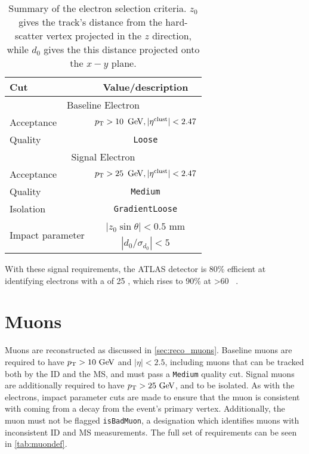 \begin{table}[ph!]
\begin{center}
    \begin{tabular}{l|c}
      \hline
      Cut            & Value/description \\
      \hline
      \hline
      \multicolumn{2}{c}{Baseline Electron}\\
      \hline
      Acceptance   & $\pt > 10\,\GeV, |\eta^\mathrm{clust}| < 2.47$ \\
      Quality      & \texttt{Loose} \\
      \hline
      \multicolumn{2}{c}{Signal Electron}\\
      \hline
      Acceptance   & $\pt > 25\,\GeV, |\eta^\mathrm{clust}| < 2.47$ \\
      Quality          & \texttt{Medium} \\
      Isolation        & \texttt{GradientLoose} \\
      \multirow{2}{*}{Impact parameter} & $|z_0 \sin\theta|< 0.5$ mm \\
                       & $|d_0/\sigma_{d_0}|< 5$ \\ 
      \hline
      \hline
\end{tabular}
\end{center}
\caption{Summary of the electron selection criteria. $z_0$ gives the track's distance from the hard-scatter vertex projected in the $z$ direction, while $d_0$ gives the this distance projected onto the $x-y$ plane.}              
\label{tab:eledef}
\end{table}

With these signal requirements, the \ac{ATLAS} detector is 80\% efficient at identifying electrons with a \pt of 25 \gev, which rises to 90\% at \pt>60 \gev~\cite{ATLAS-CONF-2014-032}. %

\section{Muons}

Muons are reconstructed as discussed in \autoref{sec:reco_muons}. Baseline muons are required to have $\pt>10\gev$ and $|\eta|<2.5$, including muons that can be tracked both by the \ac{ID} and the \ac{MS}, and must pass a \texttt{Medium} quality cut. Signal muons are additionally required to have $\pt>25\gev$, and to be isolated. As with the electrons, impact parameter cuts are made to ensure that the muon is consistent with coming from a decay from the event's primary vertex. Additionally, the muon must not be flagged \texttt{isBadMuon}, a designation which identifies muons with inconsistent \ac{ID} and \ac{MS} \pt measurements. The full set of requirements can be seen in \autoref{tab:muondef}.

